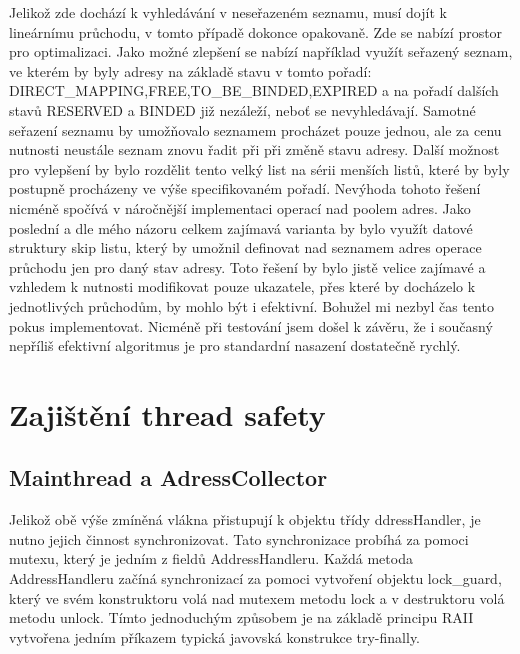 \documentclass[12pt,a4paper]{report}
\begin{document}
Jelikož zde dochází k vyhledávání v neseřazeném seznamu, musí dojít k lineárnímu průchodu, v tomto případě dokonce opakovaně. Zde se nabízí prostor pro optimalizaci. Jako možné zlepšení se nabízí například využít seřazený seznam, ve kterém by byly adresy na základě stavu v tomto pořadí: DIRECT\_MAPPING,FREE,TO\_BE\_BINDED,EXPIRED a na pořadí dalších stavů RESERVED a BINDED již nezáleží, neboť se nevyhledávají. Samotné seřazení seznamu by umožňovalo seznamem procházet pouze jednou, ale za cenu nutnosti neustále seznam znovu řadit při při změně stavu adresy. Další možnost pro vylepšení by bylo rozdělit tento velký list na sérii menších listů, které by byly postupně procházeny ve výše specifikovaném pořadí. Nevýhoda tohoto řešení nicméně spočívá v náročnější implementaci operací nad poolem adres. Jako poslední a dle mého názoru celkem zajímavá varianta by bylo využít datové struktury skip listu, který by umožnil definovat nad seznamem adres operace průchodu jen pro daný stav adresy. Toto řešení by bylo jistě velice zajímavé a vzhledem k nutnosti modifikovat pouze ukazatele, přes které by docházelo k jednotlivých průchodům, by mohlo být i efektivní. Bohužel mi nezbyl čas tento pokus implementovat. Nicméně při testování jsem došel k závěru, že i současný nepříliš efektivní algoritmus je pro standardní nasazení dostatečně rychlý.
\section{Zajištění thread safety}
\subsection*{Mainthread a AdressCollector}
Jelikož obě výše zmíněná vlákna přistupují k objektu  třídy ddressHandler, je nutno jejich činnost synchronizovat. Tato synchronizace probíhá za pomoci mutexu, který je jedním z fieldů AddressHandleru. Každá metoda AddressHandleru začíná synchronizací za pomoci vytvoření objektu lock\_guard, který ve svém konstruktoru volá nad mutexem metodu lock a v destruktoru volá metodu unlock. Tímto jednoduchým způsobem je na základě principu RAII vytvořena jedním příkazem typická javovská konstrukce try-finally.
\end{document}
